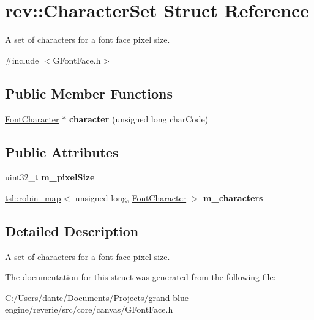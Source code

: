 \hypertarget{structrev_1_1_character_set}{}\section{rev\+::Character\+Set Struct Reference}
\label{structrev_1_1_character_set}


A set of characters for a font face pixel size.  




{\ttfamily \#include $<$G\+Font\+Face.\+h$>$}

\subsection*{Public Member Functions}
\begin{DoxyCompactItemize}
\item 
\mbox{\label{structrev_1_1_character_set_a1ccd0a6b23f0bd751a90bcd68b4d6c31}} 
\mbox{\hyperlink{structrev_1_1_font_character}{Font\+Character}} $\ast$ {\bfseries character} (unsigned long char\+Code)
\end{DoxyCompactItemize}
\subsection*{Public Attributes}
\begin{DoxyCompactItemize}
\item 
\mbox{\label{structrev_1_1_character_set_a7b2b91cf34677b3a43f2902420dbd009}} 
uint32\+\_\+t {\bfseries m\+\_\+pixel\+Size}
\item 
\mbox{\label{structrev_1_1_character_set_acdaa4ad434f7d65054ce92300790ec27}} 
\mbox{\hyperlink{classtsl_1_1robin__map}{tsl\+::robin\+\_\+map}}$<$ unsigned long, \mbox{\hyperlink{structrev_1_1_font_character}{Font\+Character}} $>$ {\bfseries m\+\_\+characters}
\end{DoxyCompactItemize}


\subsection{Detailed Description}
A set of characters for a font face pixel size. 

The documentation for this struct was generated from the following file\+:\begin{DoxyCompactItemize}
\item 
C\+:/\+Users/dante/\+Documents/\+Projects/grand-\/blue-\/engine/reverie/src/core/canvas/G\+Font\+Face.\+h\end{DoxyCompactItemize}
